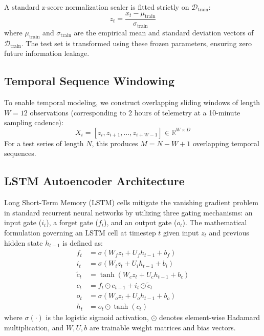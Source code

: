 \documentclass[conference]{IEEEtran}
\begin{document}
A standard z-score normalization scaler is fitted strictly on $\mathcal{D}_{\text{train}}$:
\begin{equation}
    z_t = \frac{x_t - \mu_{\text{train}}}{\sigma_{\text{train}}}
\end{equation}
where $\mu_{\text{train}}$ and $\sigma_{\text{train}}$ are the empirical mean and standard deviation vectors of $\mathcal{D}_{\text{train}}$. The test set is transformed using these frozen parameters, ensuring zero future information leakage.

\subsection{Temporal Sequence Windowing}
To enable temporal modeling, we construct overlapping sliding windows of length $W = 12$ observations (corresponding to 2 hours of telemetry at a 10-minute sampling cadence):
\begin{equation}
    X_i = [z_{i}, z_{i+1}, \dots, z_{i+W-1}] \in \mathbb{R}^{W \times D}
\end{equation}
For a test series of length $N$, this produces $M = N - W + 1$ overlapping temporal sequences.

\subsection{LSTM Autoencoder Architecture}
Long Short-Term Memory (LSTM) cells mitigate the vanishing gradient problem in standard recurrent neural networks by utilizing three gating mechanisms: an input gate ($i_t$), a forget gate ($f_t$), and an output gate ($o_t$). The mathematical formulation governing an LSTM cell at timestep $t$ given input $z_t$ and previous hidden state $h_{t-1}$ is defined as:
\begin{align}
    f_t &= \sigma(W_f z_t + U_f h_{t-1} + b_f) \\
    i_t &= \sigma(W_i z_t + U_i h_{t-1} + b_i) \\
    \tilde{c}_t &= \tanh(W_c z_t + U_c h_{t-1} + b_c) \\
    c_t &= f_t \odot c_{t-1} + i_t \odot \tilde{c}_t \\
    o_t &= \sigma(W_o z_t + U_o h_{t-1} + b_o) \\
    h_t &= o_t \odot \tanh(c_t)
\end{align}
where $\sigma(\cdot)$ is the logistic sigmoid activation, $\odot$ denotes element-wise Hadamard multiplication, and $W, U, b$ are trainable weight matrices and bias vectors.
\end{document}
